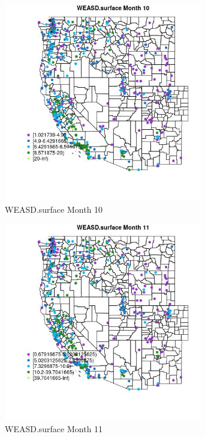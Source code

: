 \clearpage 

\begin{figure} 
\centering  
\includegraphics[width=0.77\textwidth]{Code_Outputs/ML_input_report_ML_input_PM25_Step5_part_d_de_duplicated_aves_ML_input_MapObsMo10WEASDsurface.jpg} 
\caption{\label{fig:ML_input_report_ML_input_PM25_Step5_part_d_de_duplicated_aves_ML_inputMapObsMo10WEASDsurface}WEASD.surface Month 10} 
\end{figure} 
 

\begin{figure} 
\centering  
\includegraphics[width=0.77\textwidth]{Code_Outputs/ML_input_report_ML_input_PM25_Step5_part_d_de_duplicated_aves_ML_input_MapObsMo11WEASDsurface.jpg} 
\caption{\label{fig:ML_input_report_ML_input_PM25_Step5_part_d_de_duplicated_aves_ML_inputMapObsMo11WEASDsurface}WEASD.surface Month 11} 
\end{figure} 
 

